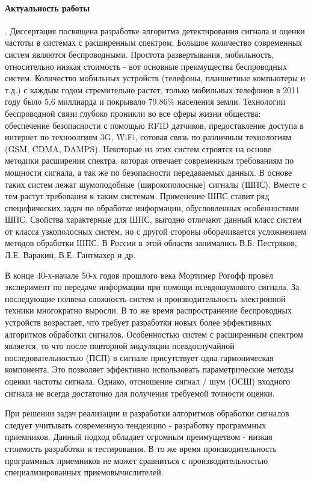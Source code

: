 \paragraph{Актуальность работы}. Диссертация посвящена разработке алгоритма детектирования сигнала и оценки частоты
в системах с расширенным спектром.
Большое количество современных систем являются беспроводными. Простота развертывания, мобильность, относительно низкая
стоимость - вот основные преимущества беспроводных систем. Количество мобильных устройств (телефоны, планшетные компьютеры
и т.д.) с каждым годом стремительно растет, только мобильных телефонов в 2011 году было 5.6 миллиарда и покрывало 79.86\%
 населения земли. Технологии беспроводной связи глубоко проникли во все сферы жизни общества:
обеспечение безопасности с помощью RFID датчиков, предоставление доступа в интернет по техноолгиям 3G, WiFi, 
сотовая связь по различным технологиям (GSM, CDMA, DAMPS). Некоторые из этих систем строятся на основе методики
расширения спектра, которая отвечает современным требованиям по мощности сигнала, а так же по безопасности передаваемых
данных. В основе таких систем лежат шумоподобные (широкополосные) сигналы (ШПС). Вместе с тем растут требования к таким
системам. Применение ШПС ставит ряд специфических задач по обработке информации, обусловленных особенностями ШПС.
Свойства характерные для ШПС, выгодно отличают данный класс систем от класса узкополосных систем, но с другой стороны
оборачивается усложнением методов обработки ШПС. В России в этой области занимались В.Б. Пестряков, Л.Е. Варакин, В.Е. Гантмахер и др.

В конце 40-х-начале 50-х годов прошлого века Мортимер Рогофф провёл эксперимент по передаче информации при помощи
псевдошумового сигнала. За последующие полвека сложность систем и производительность электронной техники многократно
выросли. В то же время распространение беспроводных устройств возрастает, что требует разработки новых более
эффективных алгоритмов обработки сигналов. Особенностью систем с расширенным спектром является, то что после повторной
модуляции псевдослучайной последовательностью (ПСП) в сигнале присутствует одна гармоническая компонента.
Это позволяет эффективно использовать параметрические методы
оценки частоты сигнала. Однако, отсношение сигнал / шум (ОСШ) входного сигнала не всегда достаточно для получения требуемой точности оценки.

При решении задач реализации и разработки алгоритмов обработки сигналов следует учитывать современную тенденцию - разработку
программных приемников. Данный подход обладает огромным преимущетвом - низкая стоимость разработки и тестирования. В то же
время производительность программных приемников не может сравниться с производительностью специализированных приемовычислителей.

